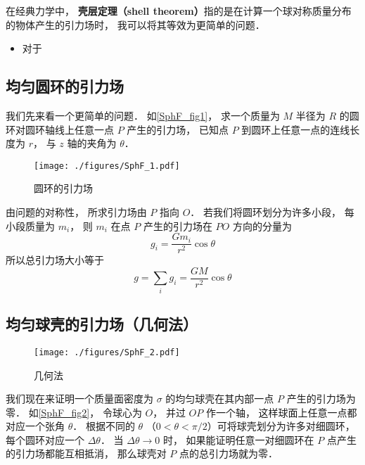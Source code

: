 

在经典力学中， \textbf{壳层定理（shell theorem）}指的是在计算一个球对称质量分布的物体产生的引力场时， 我可以将其等效为更简单的问题．
\begin{itemize}
\item 对于
\end{itemize}

\subsection{均匀圆环的引力场}
我们先来看一个更简单的问题． 如\autoref{SphF_fig1}， 求一个质量为 $M$ 半径为 $R$ 的圆环对圆环轴线上任意一点 $P$ 产生的引力场， 已知点 $P$ 到圆环上任意一点的连线长度为 $r$， 与 $z$ 轴的夹角为 $\theta$．

\begin{figure}[ht]
\centering
\texttt{[image: ./figures/SphF\_1.pdf]}
\caption{圆环的引力场} \label{SphF_fig1}
\end{figure}

由问题的对称性， 所求引力场由 $P$ 指向 $O$． 若我们将圆环划分为许多小段， 每小段质量为 $m_i$， 则 $m_i$ 在点 $P$ 产生的引力场在 $PO$ 方向的分量为
\begin{equation}
g_i = \frac{Gm_i}{r^2}\cos\theta
\end{equation}
所以总引力场大小等于
\begin{equation}\label{SphF_eq2}
g = \sum_i g_i = \frac{GM}{r^2}\cos\theta
\end{equation}

\subsection{均匀球壳的引力场（几何法）}

\begin{figure}[ht]
\centering
\texttt{[image: ./figures/SphF\_2.pdf]}
\caption{几何法} \label{SphF_fig2}
\end{figure}

我们现在来证明一个质量面密度为 $\sigma$ 的均匀球壳在其内部一点 $P$ 产生的引力场为零． 如\autoref{SphF_fig2}， 令球心为 $O$， 并过 $OP$ 作一个轴， 这样球面上任意一点都对应一个张角 $\theta$． 根据不同的 $\theta$ （$0 < \theta < \pi/2$）可将球壳划分为许多对细圆环， 每个圆环对应一个 $\Delta\theta$． 当 $\Delta\theta\to 0$ 时， 如果能证明任意一对细圆环在 $P$ 点产生的引力场都能互相抵消， 那么球壳对 $P$ 点的总引力场就为零．

